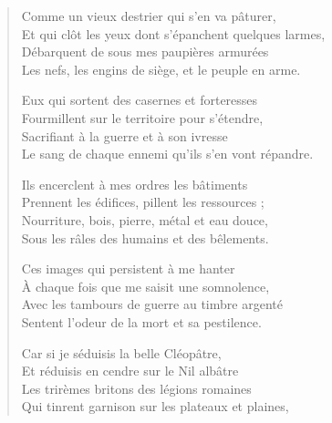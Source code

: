 \begin{verse}\quatrain
  Comme un vieux destrier qui s’en va pâturer,\\  
  Et qui clôt les yeux dont s’épanchent quelques larmes,\\  
  Débarquent de sous mes paupières armurées\\  
  Les nefs, les engins de siège, et le peuple en arme.  

  Eux qui sortent des casernes et forteresses\\  
  Fourmillent sur le territoire pour s’étendre,\\  
  Sacrifiant à la guerre et à son ivresse\\  
  Le sang de chaque ennemi qu’ils s’en vont répandre.  

  Ils encerclent à mes ordres les bâtiments\\  
  Prennent les édifices, pillent les ressources ;\\  
  Nourriture, bois, pierre, métal et eau douce,\\  
  Sous les râles des humains et des bêlements.  

  Ces images qui persistent à me hanter\\  
  À chaque  fois que me saisit une somnolence,\\  
  Avec les tambours de guerre au timbre argenté\\  
  Sentent l’odeur de la mort et sa pestilence.  

  Car si je séduisis la belle Cléopâtre,\\  
  Et réduisis en cendre sur le Nil albâtre\\  
  Les trirèmes britons des légions romaines\\  
  Qui tinrent garnison sur les plateaux et plaines,  


\end{verse}
